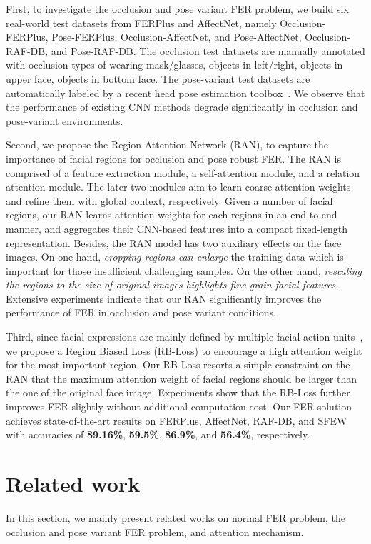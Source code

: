 \documentclass[journal]{IEEEtran}
\newcommand{\pxj}[1]{\textcolor[rgb]{0,0,0}{#1}}
\newcommand{\rpxj}[1]{\textcolor[rgb]{0,0,0}{#1}}
\newcommand{\peng}[1]{\textcolor[rgb]{0,0,0}{#1}}
\begin{document}
First, to investigate the occlusion and pose variant FER problem, \rpxj{we build six real-world test datasets from FERPlus and AffectNet, namely Occlusion-FERPlus,  Pose-FERPlus, Occlusion-AffectNet, and Pose-AffectNet, Occlusion-RAF-DB, and Pose-RAF-DB.} The occlusion test datasets are manually annotated with occlusion types of wearing mask/glasses, objects in left/right, objects in upper face, objects in bottom face. The pose-variant test datasets are automatically labeled by a recent head pose estimation toolbox~\cite{amos2016openface}. We observe that the performance of existing CNN methods degrade significantly in occlusion and pose-variant environments.



Second, we propose the Region Attention Network (RAN), to capture the importance of facial regions for occlusion and pose robust FER. \peng{The RAN is comprised of a feature extraction module, a self-attention module, and a relation attention module. The later two modules aim to learn coarse attention weights and refine them with global context, respectively.} Given a number of facial regions, our RAN \peng{learns attention weights for each regions in an end-to-end manner, and} aggregates their CNN-based features into a compact fixed-length representation. \pxj{Besides, the RAN model has two auxiliary effects on the face images. On one hand, \peng{\textit{cropping regions can enlarge} the training data which is important for those insufficient challenging samples}. On the other hand, \textit{rescaling the regions to the size of original images highlights fine-grain facial features}.} Extensive experiments indicate that our RAN significantly improves the performance of FER in occlusion and pose variant conditions.

Third, since facial expressions are mainly defined by \peng{multiple facial action units}~\cite{boucher1975facial}, we propose a Region Biased Loss (RB-Loss) to encourage a high attention weight for the most important region. Our RB-Loss resorts a simple constraint on the RAN that the maximum attention weight of facial regions should be larger than the one of the original face image. Experiments show that the RB-Loss further improves FER slightly without additional computation cost.
Our FER solution achieves state-of-the-art results on FERPlus, AffectNet, RAF-DB, and SFEW with accuracies of \textbf{89.16\%}, \textbf{59.5\%}, \textbf{86.9\%}, and \textbf{56.4\%}, respectively. 


\section{Related work}
\label{related}
\pxj{In this section, we mainly present related works on normal FER problem, the occlusion and pose variant FER problem, and attention mechanism.}
\end{document}
